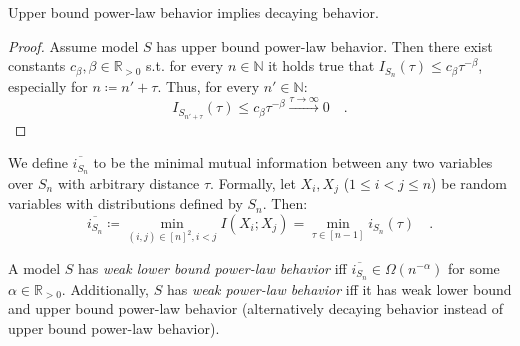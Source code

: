 \documentclass[../../main.tex]{subfiles}
\begin{document}
\pagebreak
    \begin{proposition}
        Upper bound power-law behavior implies decaying behavior.
    \end{proposition}
    \vspace{-2.5em}
    \begin{proof}
        Assume model $S$ has upper bound power-law behavior. Then there exist constants $c_\beta, \beta \in \mathbb{R}_{>0}$ s.t. for every $n \in \mathbb{N}$ it holds true that $I_{S_n}(\tau) \leq c_\beta \tau^{-\beta}$, especially for $n \coloneqq n' + \tau$. Thus, for every $n' \in \mathbb{N}$:
        \[
            I_{S_{n' + \tau}}(\tau) \leq c_\beta \tau^{-\beta} \xrightarrow{\tau \to \infty} 0 \quad .
        \]
    \end{proof}

    \begin{definition}
        We define $\overline{i_{S_n}}$ to be the minimal mutual information between any two variables over $S_n$ with arbitrary distance $\tau$. Formally, let $X_i, X_j$ ($1 \leq i < j \leq n$) be random variables with distributions defined by $S_n$. Then:
        \[
            \overline{i_{S_n}} \coloneqq \min_{(i, j) \in [n]^2, i < j} I(X_i; X_j) = \min_{\tau \in [n - 1]} i_{S_n}(\tau) \quad .
        \]
    \end{definition}

    \begin{definition}
        \label{definition:weak_power_law_behavior}
        A model $S$ has \emph{weak lower bound power-law behavior} iff $\overline{i_{S_n}} \in \Omega(n^{-\alpha})$ for some $\alpha \in \mathbb{R}_{>0}$. Additionally, $S$ has \emph{weak power-law behavior} iff it has weak lower bound and upper bound power-law behavior (alternatively decaying behavior instead of upper bound power-law behavior).
    \end{definition}
\end{document}
